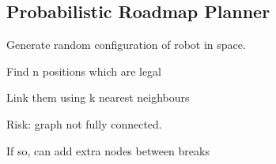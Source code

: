 
\subsection{Probabilistic Roadmap Planner}

Generate random configuration of robot in space.

Find n positions which are legal

Link them using k nearest neighbours

Risk: graph not fully connected.

If so, can add extra nodes between breaks

